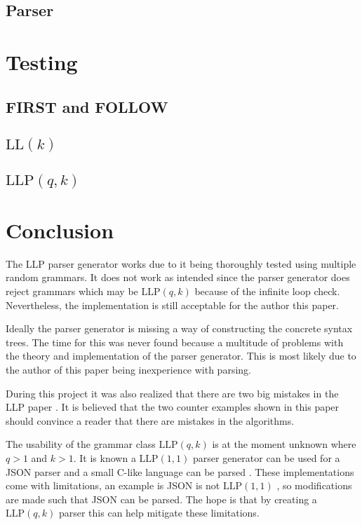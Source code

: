 \documentclass[a4paper,12pt]{article}
\newcommand\LL{\text{LL}}
\newcommand\LLP{\text{LLP}}
\theoremstyle{definition}
\begin{document}
\subsection{Parser}


\section{Testing}
\subsection{FIRST and FOLLOW}


\subsection{\texorpdfstring{$\LL(k)$}{TEXT}}


\subsection{\texorpdfstring{$\LLP(q,k)$}{TEXT}}



\section{Conclusion}
The LLP parser generator works due to it being thoroughly tested using multiple random grammars. It does not work as intended since the parser generator does reject grammars which may be $\LLP(q,k)$ because of the infinite loop check. Nevertheless, the implementation is still acceptable for the author this paper.

Ideally the parser generator is missing a way of constructing the concrete syntax trees. The time for this was never found because a multitude of problems with the theory and implementation of the parser generator. This is most likely due to the author of this paper being inexperience with parsing.

During this project it was also realized that there are two big mistakes in the LLP paper \cite{Vagner2007}. It is believed that the two counter examples shown in this paper should convince a reader that there are mistakes in the algorithms.

The usability of the grammar class $\LLP(q, k)$ is at the moment unknown where $q > 1$ and $k > 1$. It is known a $\LLP(1, 1)$ parser generator can be used for a JSON parser and a small C-like language can be parsed \cite{voetter2021}. These implementations come with limitations, an example is JSON is not $\LLP(1, 1)$ \cite[60]{voetter2021}, so modifications are made such that JSON can be parsed. The hope is that by creating a $\LLP(q, k)$ parser this can help mitigate these limitations.

\printbibliography
\end{document}
